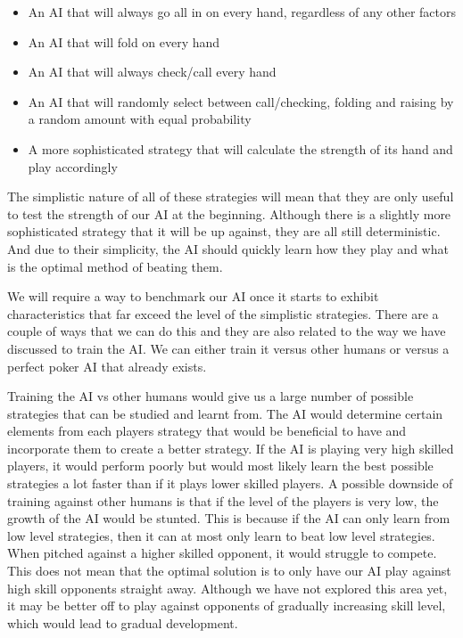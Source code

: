 \documentclass{article}
\begin{document}
\begin{multicols*}{2}
\begin{itemize}
    \item An AI that will always go all in on every hand, regardless of any other factors
    \item An AI that will fold on every hand
    \item An AI that will always check/call every hand
    \item An AI that will randomly select between call/checking, folding and raising by a random amount with equal probability
    \item A more sophisticated strategy that will calculate the strength of its hand and play accordingly
\end{itemize}

The simplistic nature of all of these strategies will mean that they are only useful to test the strength of our AI at the beginning. Although there is a slightly more sophisticated strategy that it will be up against, they are all still deterministic. And due to their simplicity, the AI should quickly learn how they play and what is the optimal method of beating them.
\newline

We will require a way to benchmark our AI once it starts to exhibit characteristics that far exceed the level of the simplistic strategies. There are a couple of ways that we can do this and they are also related to the way we have discussed to train the AI. We can either train it versus other humans or versus a perfect poker AI that already exists.
\newline

Training the AI vs other humans would give us a large number of possible strategies that can be studied and learnt from. The AI would determine certain elements from each players strategy that would be beneficial to have and incorporate them to create a better strategy. If the AI is playing very high skilled players, it would perform poorly but would most likely learn the best possible strategies a lot faster than if it plays lower skilled players. A possible downside of training against other humans is that if the level of the players is very low, the growth of the AI would be stunted. This is because if the AI can only learn from low level strategies, then it can at most only learn to beat low level strategies. When pitched against a higher skilled opponent, it would struggle to compete. This does not mean that the optimal solution is to only have our AI play against high skill opponents straight away. Although we have not explored this area yet, it may be better off to play against opponents of gradually increasing skill level, which would lead to gradual development.
\newline


\end{multicols*}
\end{document}
